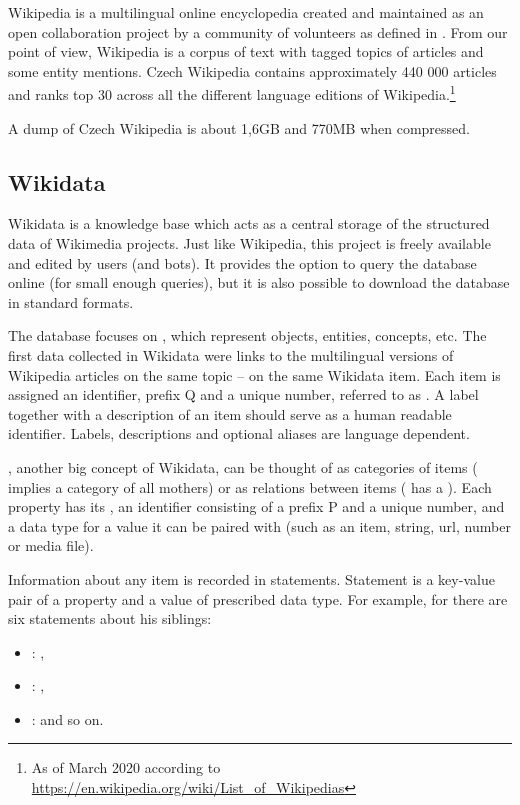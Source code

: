 Wikipedia is a multilingual online encyclopedia created and maintained as an open collaboration project by a community of volunteers as defined in \cite{wiki:wiki}. From our point of view, Wikipedia is a corpus of text with tagged topics of articles and some entity mentions. Czech Wikipedia contains approximately 440 000 articles and ranks top 30 across all the different language editions of Wikipedia.\footnote{As of March 2020 according to \url{https://en.wikipedia.org/wiki/List\_of\_Wikipedias}}

A dump of Czech Wikipedia is about 1,6GB and 770MB when compressed.

\subsection{Wikidata}

Wikidata is a knowledge base which acts as a central storage of the structured data of Wikimedia projects. Just like Wikipedia, this project is freely available and edited by users (and bots). It provides the option to query the database online (for small enough queries), but it is also possible to download the database in standard formats.

The database focuses on , which represent objects, entities, concepts, etc.  The first data collected in Wikidata were links to the multilingual versions of Wikipedia articles on the same topic -- on the same Wikidata item. Each item is assigned an identifier, prefix Q and a unique number, referred to as . A label together with a description of an item should serve as a human readable identifier. Labels, descriptions and optional aliases are language dependent.

, another big concept of Wikidata, can be thought of as categories of items ( implies a category of all mothers) or as relations between items ( has a  ). Each property has its , an identifier consisting of a prefix P and a unique number, and a data type for a value it can be paired with (such as an item, string, url, number or media file). 

Information about any item is recorded in statements. Statement is a key-value pair of a property and a value of prescribed data type. For example, for  there are six statements about his siblings:
\begin{itemize}
\item {}: ,
\item {}: ,
\item {}:  and so on. 
\end{itemize}  

